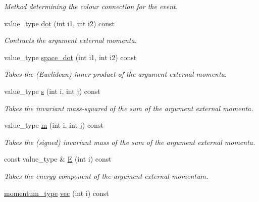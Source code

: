 \begin{DoxyCompactItemize}
\begin{DoxyCompactList}\small\item\em Method determining the colour connection for the event. \end{DoxyCompactList}\item 
\hypertarget{a00442_a35962c48138ddc39e0316fbba1422583}{value\-\_\-type \hyperlink{a00442_a35962c48138ddc39e0316fbba1422583}{dot} (int i1, int i2) const }\label{a00442_a35962c48138ddc39e0316fbba1422583}

\begin{DoxyCompactList}\small\item\em Contracts the argument external momenta. \end{DoxyCompactList}\item 
\hypertarget{a00442_aaf3de6e8effefc030367eaa67a15c0dd}{value\-\_\-type \hyperlink{a00442_aaf3de6e8effefc030367eaa67a15c0dd}{space\-\_\-dot} (int i1, int i2) const }\label{a00442_aaf3de6e8effefc030367eaa67a15c0dd}

\begin{DoxyCompactList}\small\item\em Takes the (Euclidean) inner product of the argument external momenta. \end{DoxyCompactList}\item 
value\-\_\-type \hyperlink{a00442_a6e5851bcdc5d86235f1348aea57b995a}{s} (int i, int j) const 
\begin{DoxyCompactList}\small\item\em Takes the invariant mass-\/squared of the sum of the argument external momenta. \end{DoxyCompactList}\item 
value\-\_\-type \hyperlink{a00442_ae7b1f38ebb163dcb4dc0b7f2928698a4}{m} (int i, int j) const 
\begin{DoxyCompactList}\small\item\em Takes the (signed) invariant mass of the sum of the argument external momenta. \end{DoxyCompactList}\item 
\hypertarget{a00442_a70eff6fadc1a889d712f5d95e73fb912}{const value\-\_\-type \& \hyperlink{a00442_a70eff6fadc1a889d712f5d95e73fb912}{E} (int i) const }\label{a00442_a70eff6fadc1a889d712f5d95e73fb912}

\begin{DoxyCompactList}\small\item\em Takes the energy component of the argument external momentum. \end{DoxyCompactList}\item 
\hypertarget{a00442_acee376677b0f549028eb3e8fb66f3e3c}{\hyperlink{a00559}{momentum\-\_\-type} \hyperlink{a00442_acee376677b0f549028eb3e8fb66f3e3c}{vec} (int i) const }\label{a00442_acee376677b0f549028eb3e8fb66f3e3c}


\end{DoxyCompactItemize}
